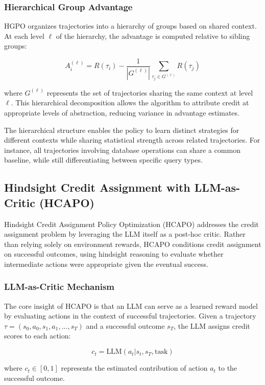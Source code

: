 \subsubsection{Hierarchical Group Advantage}

HGPO organizes trajectories into a hierarchy of groups based on shared context. At each level $\ell$ of the hierarchy, the advantage is computed relative to sibling groups:

$$A_i^{(\ell)} = R(\tau_i) - \frac{1}{|G^{(\ell)}|}\sum_{\tau_j \in G^{(\ell)}} R(\tau_j)$$

where $G^{(\ell)}$ represents the set of trajectories sharing the same context at level $\ell$. This hierarchical decomposition allows the algorithm to attribute credit at appropriate levels of abstraction, reducing variance in advantage estimates.

The hierarchical structure enables the policy to learn distinct strategies for different contexts while sharing statistical strength across related trajectories. For instance, all trajectories involving database operations can share a common baseline, while still differentiating between specific query types.

\subsection{Hindsight Credit Assignment with LLM-as-Critic (HCAPO)}

Hindsight Credit Assignment Policy Optimization (HCAPO) addresses the credit assignment problem by leveraging the LLM itself as a post-hoc critic. Rather than relying solely on environment rewards, HCAPO conditions credit assignment on successful outcomes, using hindsight reasoning to evaluate whether intermediate actions were appropriate given the eventual success.

\subsubsection{LLM-as-Critic Mechanism}

The core insight of HCAPO is that an LLM can serve as a learned reward model by evaluating actions in the context of successful trajectories. Given a trajectory $\tau = (s_0, a_0, s_1, a_1, ..., s_T)$ and a successful outcome $s_T$, the LLM assigns credit scores to each action:

$$c_t = \text{LLM}(a_t | s_t, s_T, \text{task})$$

where $c_t \in [0, 1]$ represents the estimated contribution of action $a_t$ to the successful outcome.

